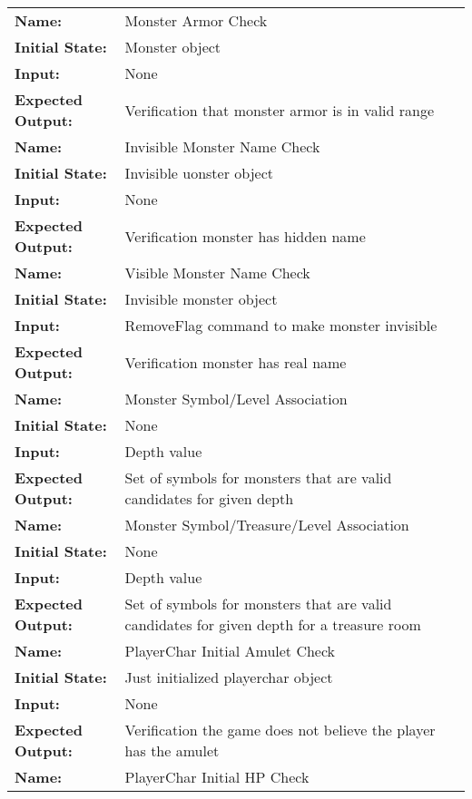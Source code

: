 \documentclass[12pt, titlepage]{article}
\begin{document}
\begin{center}
\begin{longtable}{ l | p{10cm} }
				\hline
				\rule{0pt}{1.5em}\textbf{Name:} & Monster Armor Check\\
				\textbf{Initial State:} & Monster object\\
				\textbf{Input:} & None\\
				\textbf{Expected Output:} & Verification that monster armor is in valid range\\[0.6em]
				\hline
				\rule{0pt}{1.5em}\textbf{Name:} & Invisible Monster Name Check\\
				\textbf{Initial State:} & Invisible uonster object\\
				\textbf{Input:} & None\\
				\textbf{Expected Output:} & Verification monster has hidden name\\[0.6em]
				\hline
				\rule{0pt}{1.5em}\textbf{Name:} & Visible Monster Name Check\\
				\textbf{Initial State:} & Invisible monster object\\
				\textbf{Input:} & RemoveFlag command to make monster invisible\\
				\textbf{Expected Output:} & Verification monster has real name\\[0.6em]
				\hline
				\rule{0pt}{1.5em}\textbf{Name:} & Monster Symbol/Level Association\\
				\textbf{Initial State:} & None\\
				\textbf{Input:} & Depth value\\
				\textbf{Expected Output:} & Set of symbols for monsters that are valid candidates for given depth\\[0.6em]
				\hline
				\rule{0pt}{1.5em}\textbf{Name:} & Monster Symbol/Treasure/Level Association\\
				\textbf{Initial State:} & None\\
				\textbf{Input:} & Depth value\\
				\textbf{Expected Output:} & Set of symbols for monsters that are valid candidates for given depth for a treasure room\\[0.6em]
				\hline
				\rule{0pt}{1.5em}\textbf{Name:} & PlayerChar Initial Amulet Check\\
				\textbf{Initial State:} & Just initialized playerchar object\\
				\textbf{Input:} & None\\
				\textbf{Expected Output:} & Verification the game does not believe the player has the amulet\\[0.6em]
				\hline
				\rule{0pt}{1.5em}\textbf{Name:} & PlayerChar Initial HP Check\\

\end{longtable}
\end{center}
\end{document}
